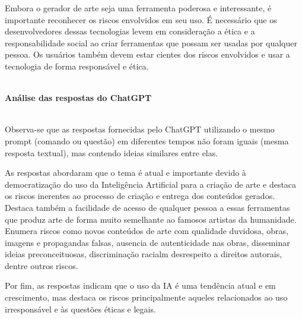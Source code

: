 Embora o gerador de arte seja uma ferramenta poderosa e interessante, é importante reconhecer os 
riscos envolvidos em seu uso. É necessário que os desenvolvedores dessas tecnologias levem em consideração 
a ética e a responsabilidade social ao criar ferramentas que possam ser usadas por qualquer pessoa. 
Os usuários também devem estar cientes dos riscos envolvidos e usar a tecnologia de forma responsável e ética.

~\\ 

\textbf{Análise das respostas do ChatGPT}

~\\

Observa-se que as respostas fornecidas pelo ChatGPT utilizando o mesmo prompt (comando ou questão) em diferentes tempos
não foram iguais (mesma resposta textual), mas contendo ideias similares entre elas. 

As respostas abordaram que o tema é atual 
e importante devido à democratização do uso da Inteligência Artificial para a criação de arte e destaca os riscos inerentes 
ao processo de criação e entrega dos conteúdos gerados. Destaca também a facilidade de acesso de qualquer pessoa a essas ferramentas 
que produz arte de forma muito semelhante ao famosos artistas da humanidade. Enumera riscos como novos conteúdos de arte 
com qualidade duvidosa, obras, imagens e propagandas falsas, ausencia de autenticidade nas obras, 
disseminar ideias preconceituosas, discriminação racialm desrespeito a direitos autorais, dentre outros riscos.

Por fim, as respostas indicam que o uso da IA é uma tendência atual e em crescimento, mas destaca os riscos principalmente
aqueles relacionados ao uso irresponsável e às questões éticas e legais.
 